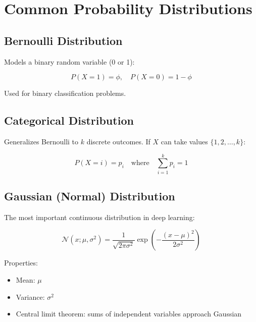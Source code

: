 
\section{Common Probability Distributions }
\label{sec:common-distributions}

\subsection{Bernoulli Distribution}

Models a binary random variable (0 or 1):

\begin{equation}
P(X=1) = \phi, \quad P(X=0) = 1-\phi
\end{equation}

Used for binary classification problems.

\subsection{Categorical Distribution}

Generalizes Bernoulli to $k$ discrete outcomes. If $X$ can take values $\{1, 2, \ldots, k\}$:

\begin{equation}
P(X=i) = p_i \quad \text{where} \quad \sum_{i=1}^{k} p_i = 1
\end{equation}

\subsection{Gaussian (Normal) Distribution}

The most important continuous distribution in deep learning:

\begin{equation}
\mathcal{N}(x; \mu, \sigma^2) = \frac{1}{\sqrt{2\pi\sigma^2}} \exp\left(-\frac{(x-\mu)^2}{2\sigma^2}\right)
\end{equation}

Properties:
\begin{itemize}
    \item Mean: $\mu$
    \item Variance: $\sigma^2$
    \item Central limit theorem: sums of independent variables approach Gaussian
\end{itemize}

